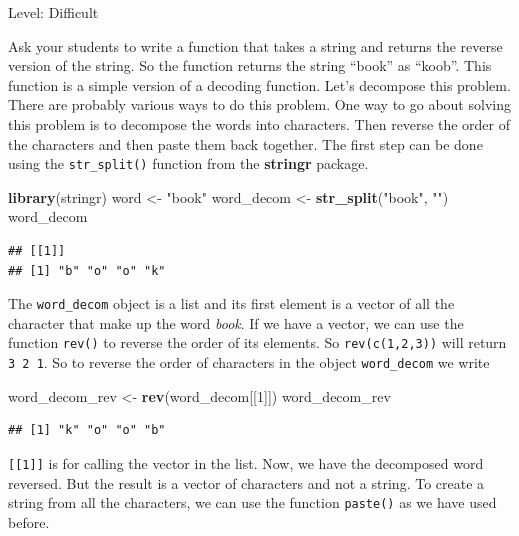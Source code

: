 \documentclass[]{book}
\newenvironment{Shaded}{\begin{snugshade}}{\end{snugshade}}
\newcommand{\DecValTok}[1]{\textcolor[rgb]{0.00,0.00,0.81}{#1}}
\newcommand{\KeywordTok}[1]{\textcolor[rgb]{0.13,0.29,0.53}{\textbf{#1}}}
\newcommand{\NormalTok}[1]{#1}
\newcommand{\StringTok}[1]{\textcolor[rgb]{0.31,0.60,0.02}{#1}}
\begin{document}
Level: Difficult

Ask your students to write a function that takes a string and returns the reverse version of the string. So the function returns the string ``book'' as ``koob''. This function is a simple version of a decoding function. Let's decompose this problem. There are probably various ways to do this problem. One way to go about solving this problem is to decompose the words into characters. Then reverse the order of the characters and then paste them back together. The first step can be done using the \texttt{str\_split()} function from the \textbf{stringr} package.

\begin{Shaded}
\begin{Highlighting}[]
\KeywordTok{library}\NormalTok{(stringr)}
\NormalTok{word <-}\StringTok{ "book"}
\NormalTok{word_decom <-}\StringTok{ }\KeywordTok{str_split}\NormalTok{(}\StringTok{"book"}\NormalTok{, }\StringTok{""}\NormalTok{)}
\NormalTok{word_decom}
\end{Highlighting}
\end{Shaded}

\begin{verbatim}
## [[1]]
## [1] "b" "o" "o" "k"
\end{verbatim}

The \texttt{word\_decom} object is a list and its first element is a vector of all the character that make up the word \emph{book}. If we have a vector, we can use the function \texttt{rev()} to reverse the order of its elements. So \texttt{rev(c(1,2,3))} will return \texttt{3\ 2\ 1}. So to reverse the order of characters in the object \texttt{word\_decom} we write

\begin{Shaded}
\begin{Highlighting}[]
\NormalTok{word_decom_rev <-}\StringTok{ }\KeywordTok{rev}\NormalTok{(word_decom[[}\DecValTok{1}\NormalTok{]])}
\NormalTok{word_decom_rev}
\end{Highlighting}
\end{Shaded}

\begin{verbatim}
## [1] "k" "o" "o" "b"
\end{verbatim}

\texttt{{[}{[}1{]}{]}} is for calling the vector in the list. Now, we have the decomposed word reversed. But the result is a vector of characters and not a string. To create a string from all the characters, we can use the function \texttt{paste()} as we have used before.
\end{document}
